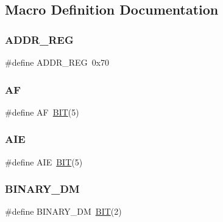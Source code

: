 \subsection{Macro Definition Documentation}
\mbox{\label{group__rtc_gaee714b0468cb683740ae28b1e0ad25e6}} 
\subsubsection{\texorpdfstring{A\+D\+D\+R\+\_\+\+R\+EG}{ADDR\_REG}}
{\footnotesize\ttfamily \#define A\+D\+D\+R\+\_\+\+R\+EG~0x70}

\mbox{\label{group__rtc_ga76ba789cde9c36cd57dbb390bdee7661}} 
\subsubsection{\texorpdfstring{AF}{AF}}
{\footnotesize\ttfamily \#define AF~\mbox{\hyperlink{group__vbe_ga3a8ea58898cb58fc96013383d39f482c}{B\+IT}}(5)}

\mbox{\label{group__rtc_ga113847820d539c6a6836993b84d22800}} 
\subsubsection{\texorpdfstring{A\+IE}{AIE}}
{\footnotesize\ttfamily \#define A\+IE~\mbox{\hyperlink{group__vbe_ga3a8ea58898cb58fc96013383d39f482c}{B\+IT}}(5)}

\mbox{\label{group__rtc_ga96df1c1afaaa70a1b805c83bad18ff26}} 
\subsubsection{\texorpdfstring{B\+I\+N\+A\+R\+Y\+\_\+\+DM}{BINARY\_DM}}
{\footnotesize\ttfamily \#define B\+I\+N\+A\+R\+Y\+\_\+\+DM~\mbox{\hyperlink{group__vbe_ga3a8ea58898cb58fc96013383d39f482c}{B\+IT}}(2)}

\mbox{\label{group__rtc_gad27cc17b25bb93134368d5eb21126eae}} 
